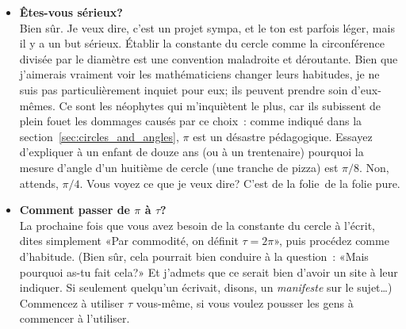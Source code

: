 \begin{itemize}

  \item \textbf{Êtes-vous sérieux\ns?} \\ Bien sûr. Je veux dire, c'est un projet
  sympa, et le ton est parfois léger, mais il y a un but sérieux. Établir la
  constante du cercle comme la circonférence divisée par le diamètre est une
  convention maladroite et déroutante. Bien que j'aimerais vraiment voir les
  mathématiciens changer leurs habitudes, je ne suis pas particulièrement
  inquiet pour eux\ns; ils peuvent prendre soin d'eux-mêmes. Ce sont les
  néophytes qui m'inquiètent le plus, car ils subissent de plein fouet les
  dommages causés par ce choix~: comme indiqué dans la section~\ref{sec:circles_and_angles}, $\pi$ est
  un désastre pédagogique. Essayez d'expliquer à un enfant de douze ans (ou à un
  trentenaire) pourquoi la mesure d'angle d'un huitième de cercle (une 
  tranche de pizza) est $\pi/8$. Non, attends, $\pi/4$. Vous voyez ce
  que je veux dire\ns? C'est de la folie\textellipsis\ de la folie pure.

  \item \textbf{Comment passer de $\pi$ à $\tau$\ns?} \\ La prochaine fois que
  vous avez besoin de la constante du cercle à l'écrit, dites
  simplement «\ns Par commodité, on définit $\tau=2\pi$\ns », puis procédez comme
  d'habitude. (Bien sûr, cela pourrait bien conduire à la question~:
  «\ns Mais pourquoi as-tu fait cela\ns?\ns » Et j'admets que ce serait bien
  d'avoir un site à leur indiquer. Si seulement quelqu'un écrivait, disons, un
  \emph{manifeste} sur le sujet\ldots) Commencez à utiliser $\tau$ vous-même, si
  vous voulez pousser les gens à commencer à l'utiliser.


\end{itemize}
